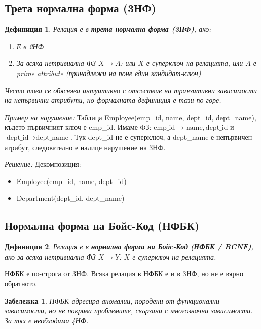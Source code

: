 \documentclass{scrartcl}
\newtheorem{definition}{Дефиниция}
\newtheorem{remark}{Забележка}
\begin{document}
\begin{FlushLeft}
\subsection{Трета нормална форма (3НФ)}

\begin{definition}
Релация е в \textbf{\textit{трета нормална форма (3НФ)}}, ако:
\begin{enumerate}
    \item Е в 2НФ
    \item За всяка нетривиална ФЗ $X \rightarrow A$: или $X$ е суперключ на релацията, или $A$ е prime attribute (принадлежи на поне един кандидат-ключ)
\end{enumerate}

Често това се обяснява интуитивно с отсъствие на транзитивни зависимости на непървични атрибути, но формалната дефиниция е тази по-горе.
\end{definition}

\textit{Пример на нарушение:} Таблица Employee(emp\_id, name, dept\_id, dept\_name), където първичният ключ е emp\_id. Имаме ФЗ: $\text{emp\_id} \rightarrow \text{name}, \text{dept\_id}$ и $\text{dept\_id} \rightarrow \text{dept\_name}$. Тук dept\_id не е суперключ, а dept\_name е непървичен атрибут, следователно е налице нарушение на 3НФ.

\textit{Решение:} Декомпозиция:
\begin{itemize}
    \item Employee(emp\_id, name, dept\_id)
    \item Department(dept\_id, dept\_name)
\end{itemize}

\subsection{Нормална форма на Бойс-Код (НФБК)}

\begin{definition}
Релация е в \textbf{\textit{нормална форма на Бойс-Код (НФБК / BCNF)}}, ако за всяка нетривиална ФЗ $X \rightarrow Y$: $X$ е суперключ на релацията.
\end{definition}

НФБК е по-строга от 3НФ. Всяка релация в НФБК е и в 3НФ, но не е вярно обратното.

\begin{remark}
НФБК адресира аномалии, породени от функционални зависимости, но не покрива проблемите, свързани с многозначни зависимости. За тях е необходима 4НФ.
\end{remark}


\end{FlushLeft}
\end{document}
